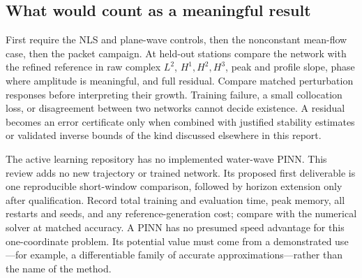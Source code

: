 \subsection{What would count as a meaningful result}

First require the NLS and plane-wave controls, then the nonconstant mean-flow
case, then the packet campaign.  At held-out stations compare the network
with the refined reference in raw complex $L^2$, $H^1,H^2,H^3$, peak and
profile slope, phase where amplitude is meaningful, and full residual.
Compare matched perturbation responses before interpreting their growth.
Training failure, a small collocation loss, or disagreement between two
networks cannot decide existence.  A residual becomes an error certificate
only when combined with justified stability estimates or validated inverse
bounds of the kind discussed elsewhere in this report.

The active learning repository has no implemented water-wave PINN.  This
review adds no new trajectory or trained network.  Its proposed first
deliverable is one reproducible short-window comparison, followed by horizon
extension only after qualification.  Record total training and evaluation
time, peak memory, all restarts and seeds, and any reference-generation cost;
compare with the numerical solver at matched accuracy.  A PINN has no
presumed speed advantage for this one-coordinate problem.  Its potential
value must come from a demonstrated use---for example, a differentiable
family of accurate approximations---rather than the name of the method.
